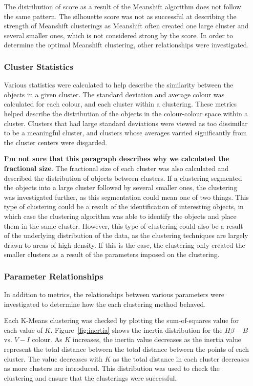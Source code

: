 The distribution of score as a result of the Meanshift algorithm does not follow the same pattern.
The silhouette score was not as successful at describing the strength of Meanshift clusterings as Meanshift often created one large cluster and several smaller ones, which is not considered strong by the score.
In order to determine the optimal Meanshift clustering, other relationships were investigated.

\subsubsection{Cluster Statistics}
Various statistics were calculated to help describe the similarity between the objects in a given cluster.
The standard deviation and average colour was calculated for each colour, and each cluster within a clustering. 
These metrics helped describe the distribution of the objects in the colour-colour space within a cluster. 
Clusters that had large standard deviations were viewed as too dissimilar to be a meaningful cluster, and clusters whose averages varried significantly from the cluster centers were disgarded.

\textbf{I'm not sure that this paragraph describes why we calculated the fractional size}.
The fractional size of each cluster was also calculated and described the distribution of objects between clusters.
If a clustering segmented the objects into a large cluster followed by several smaller ones, the clustering was investigated further, as this segmentation could mean one of two things. 
This type of clustering could be a result of the identification of interesting objects, in which case the clustering algorithm was able to identify the objects and place them in the same cluster.
However, this type of clustering could also be a result of the underlying distribution of the data, as the clustering techniques are largely drawn to areas of high density.
If this is the case, the clustering only created the smaller clusters as a result of the parameters imposed on the clustering.

\subsubsection{Parameter Relationships}
In addition to metrics, the relationships between various parameters were investigated to determine how the each clustering method behaved.

Each K-Means clustering was checked by plotting the sum-of-squares value for each value of $K$.
Figure~\ref{fig:inertia} shows the inertia distribution for the $H\beta - B$ vs. $V - I$ colour.
As $K$ increases, the inertia value decreases as the inertia value represent the total distance between the total distance between the points of each cluster.
The value decreases with $K$ as the total distance in each cluster decreases as more clusters are introduced.
This distribution was used to check the clustering and ensure that the clusterings were successful.

